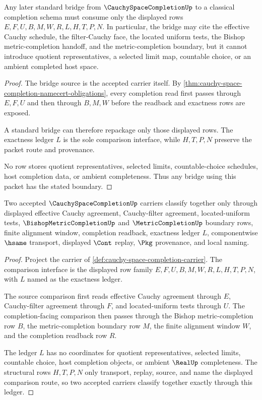 \begin{theorem}
\label{thm:cauchy-space-completion-standard-bridge-boundary}
Any later standard bridge from $\CauchySpaceCompletionUp$ to a classical completion schema must consume only the displayed rows $E,F,U,B,M,W,R,L,H,T,P,N$. In particular, the bridge may cite the effective Cauchy schedule, the filter-Cauchy face, the located uniform tests, the Bishop metric-completion handoff, and the metric-completion boundary, but it cannot introduce quotient representatives, a selected limit map, countable choice, or an ambient completed host space.
\end{theorem}
\begin{proof}
The bridge source is the accepted carrier itself. By \autoref{thm:cauchy-space-completion-namecert-obligations}, every completion read first passes through $E,F,U$ and then through $B,M,W$ before the readback and exactness rows are exposed.

A standard bridge can therefore repackage only those displayed rows. The exactness ledger $L$ is the sole comparison interface, while $H,T,P,N$ preserve the packet route and provenance.

No row stores quotient representatives, selected limits, countable-choice schedules, host completion data, or ambient completeness. Thus any bridge using this packet has the stated boundary.
\end{proof}

\begin{theorem}
\label{thm:cauchy-space-completion-exactness-ledger}
Two accepted $\CauchySpaceCompletionUp$ carriers classify together only through displayed effective Cauchy agreement, Cauchy-filter agreement, located-uniform tests, $\BishopMetricCompletionUp$ and $\MetricCompletionUp$ boundary rows, finite alignment window, completion readback, exactness ledger $L$, componentwise $\hsame$ transport, displayed $\Cont$ replay, $\Pkg$ provenance, and local naming.
\end{theorem}
\begin{proof}
Project the carrier of \autoref{def:cauchy-space-completion-carrier}. The comparison interface is the displayed row family $E,F,U,B,M,W,R,L,H,T,P,N$, with $L$ named as the exactness ledger.

The source comparison first reads effective Cauchy agreement through $E$, Cauchy-filter agreement through $F$, and located-uniform tests through $U$. The completion-facing comparison then passes through the Bishop metric-completion row $B$, the metric-completion boundary row $M$, the finite alignment window $W$, and the completion readback row $R$.

The ledger $L$ has no coordinates for quotient representatives, selected limits, countable choice, host completion objects, or ambient $\RealUp$ completeness. The structural rows $H,T,P,N$ only transport, replay, source, and name the displayed comparison route, so two accepted carriers classify together exactly through this ledger.
\end{proof}

